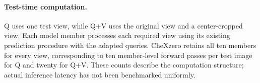 \paragraph{Test-time computation.}
Q uses one test view, while Q+V uses the original view and a center-cropped view. Each model member processes each required view using its existing prediction procedure with the adapted queries. CheXzero retains all ten members for every view, corresponding to ten member-level forward passes per test image for Q and twenty for Q+V. These counts describe the computation structure; actual inference latency has not been benchmarked uniformly.



